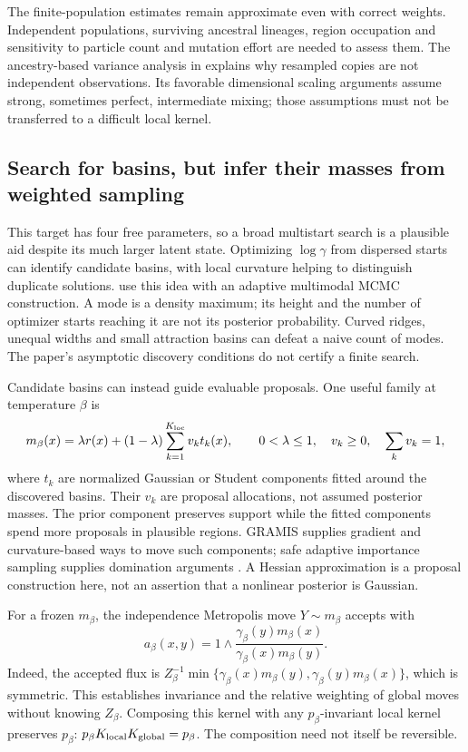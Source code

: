The finite-population estimates remain approximate even with correct weights.
Independent populations, surviving ancestral lineages, region occupation and
sensitivity to particle count and mutation effort are needed to assess them.
The ancestry-based variance analysis in \citet[Section 4.1]{dai2022smc}
explains why resampled copies are not independent observations. Its favorable
dimensional scaling arguments assume strong, sometimes perfect, intermediate
mixing; those assumptions must not be transferred to a difficult local kernel.

\subsection{Search for basins, but infer their masses from weighted sampling}

This target has four free parameters, so a broad multistart search is a
plausible aid despite its much larger latent state. Optimizing $\log\gamma$
from dispersed starts can identify candidate basins, with local curvature
helping to distinguish duplicate solutions. \citet[Section 2.2 and
Algorithm 3]{pompe2020adaptive} use this idea with an adaptive multimodal
MCMC construction. A mode is a density maximum; its height and the number of
optimizer starts reaching it are not its posterior probability. Curved ridges,
unequal widths and small attraction basins can defeat a naive count of modes.
The paper's asymptotic discovery conditions do not certify a finite search.

Candidate basins can instead guide evaluable proposals. One useful family at
temperature $\beta$ is
\begin{equation}
 m_\beta(x)=\lambda r(x)+(1-\lambda)
              \sum_{k=1}^{K_{\rm loc}}v_k t_k(x),\qquad
 0<\lambda\le1,\quad v_k\ge0,\quad\sum_kv_k=1,
 \label{eq:bf-is-mode-mixture}
\end{equation}
where $t_k$ are normalized Gaussian or Student components fitted around the
discovered basins. Their $v_k$ are proposal allocations, not assumed posterior
masses. The prior component preserves support while the fitted components
spend more proposals in plausible regions. GRAMIS supplies gradient and
curvature-based ways to move such components; safe adaptive importance
sampling supplies domination arguments
\citep{elvira2023gramis,delyon2021safe}. A Hessian approximation is a proposal
construction here, not an assertion that a nonlinear posterior is Gaussian.

For a frozen $m_\beta$, the independence Metropolis move $Y\sim m_\beta$
accepts with
\begin{equation}
 a_\beta(x,y)=1\wedge
 \frac{\gamma_\beta(y)m_\beta(x)}{\gamma_\beta(x)m_\beta(y)}.
 \label{eq:bf-is-mode-mh}
\end{equation}
Indeed, the accepted flux is
$Z_\beta^{-1}\min\{\gamma_\beta(x)m_\beta(y),
\gamma_\beta(y)m_\beta(x)\}$, which is symmetric. This establishes
invariance and the relative weighting of global moves without knowing
$Z_\beta$. Composing this kernel with any $p_\beta$-invariant local kernel
preserves $p_\beta$: $p_\beta K_{\rm local}K_{\rm global}=p_\beta$.
The composition need not itself be reversible.

